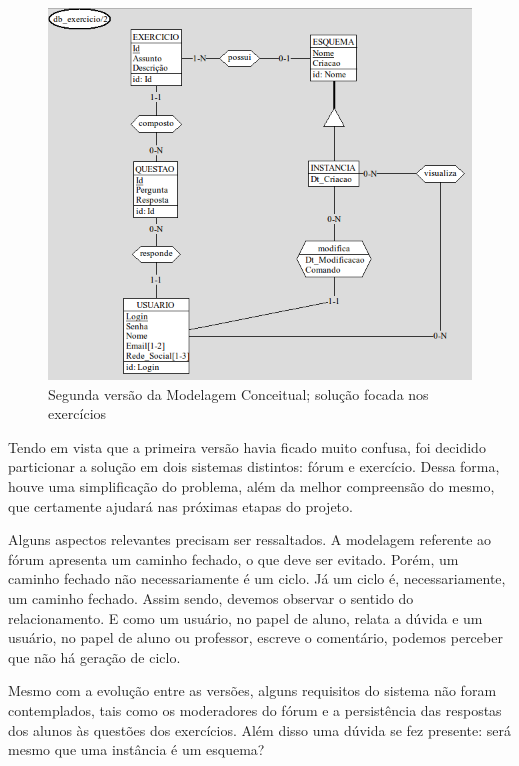 \documentclass[graduacao,brazil]{ThesisPUC}
\begin{document}
\begin{figure}[H]
    \centering
    \includegraphics[width=\linewidth]{Imagens/ModelagemConceitual_exercicio_v1_1.png}
    \caption{Segunda vers\~{a}o da Modelagem Conceitual; solu\c{c}\~{a}o focada nos exerc\'{i}cios}
\end{figure}

Tendo em vista que a primeira vers\~{a}o havia ficado muito confusa, foi decidido particionar a
solu\c{c}\~{a}o em dois sistemas distintos: f\'{o}rum e exerc\'{i}cio. Dessa forma, houve uma simplifica\c{c}\~{a}o do
problema, al\'{e}m da melhor compreens\~{a}o do mesmo, que certamente ajudar\'{a} nas pr\'{o}ximas etapas
do projeto.

Alguns aspectos relevantes precisam ser ressaltados. A modelagem referente ao f\'{o}rum
apresenta um caminho fechado, o que deve ser evitado. Por\'{e}m, um caminho fechado n\~{a}o
necessariamente \'{e} um ciclo. J\'{a} um ciclo \'{e}, necessariamente, um caminho fechado. Assim sendo,
devemos observar o sentido do relacionamento. E como um usu\'{a}rio, no papel de aluno, relata a
d\'{u}vida e um usu\'{a}rio, no papel de aluno ou professor, escreve o coment\'{a}rio, podemos perceber
que n\~{a}o h\'{a} gera\c{c}\~{a}o de ciclo.

Mesmo com a evolu\c{c}\~{a}o entre as vers\~{o}es, alguns requisitos do sistema n\~{a}o foram
contemplados, tais como os moderadores do f\'{o}rum e a persist\^{e}ncia das respostas dos alunos \`{a}s
quest\~{o}es dos exerc\'{i}cios. Al\'{e}m disso uma d\'{u}vida se fez presente: ser\'{a} mesmo que uma inst\^{a}ncia
\'{e} um esquema?
\end{document}
